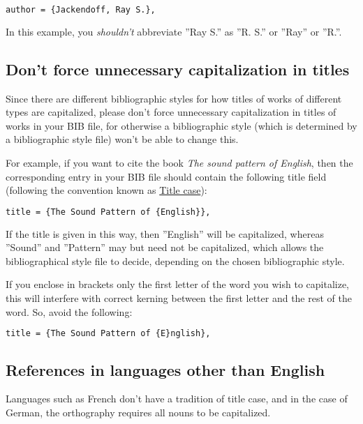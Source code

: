 \documentclass[output=paper,colorlinks,citecolor=brown,chinesefont]{langscibook}
\begin{document}
{\begin{lstlisting}[language=tex]
author = {Jackendoff, Ray S.},
\end{lstlisting}

In this example, you \emph{shouldn't} abbreviate ''Ray S.'' as ''R. S.'' or ''Ray'' or ''R.''.

\subsection{Don't force unnecessary capitalization in titles}

Since there are different bibliographic styles for how titles of works of different types are capitalized, please don't force unnecessary capitalization in titles of works in your BIB file, for otherwise a bibliographic style (which is determined by a bibliographic style file) won't be able to change this.

For example, if you want to cite the book \emph{The sound pattern of English}, then the corresponding entry in your BIB file should contain the following title field (following the convention known as \href{https://en.wikipedia.org/wiki/Letter_case#Title_case}{Title case}):

\begin{lstlisting}[language=tex]
title = {The Sound Pattern of {English}},
\end{lstlisting}

If the title is given in this way, then ''English'' will be capitalized, whereas ''Sound'' and ''Pattern'' may but need not be capitalized, which allows the bibliographical style file to decide, depending on the chosen bibliographic style. 

If you enclose in brackets only the first letter of the word you wish to capitalize, this will interfere with correct kerning between the first letter and the rest of the word. So, avoid the following:

\begin{lstlisting}[language=tex]
title = {The Sound Pattern of {E}nglish},
\end{lstlisting}

\subsection{References in languages other than English}
\label{sec:refer-lang-other:Chen}

Languages such as French don't have a tradition of title case, and in the case of German, the orthography requires all nouns to be capitalized.

}
\end{document}
